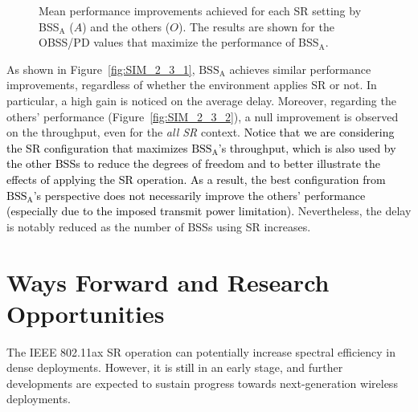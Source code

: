 \documentclass[preprint,12pt]{elsarticle}
\theoremstyle{plain}
\begin{document}
\begin{figure}[ht!]
	\centering		
	\caption{Mean performance improvements achieved for each SR setting by BSS$_\text{A}$ ($A$) and the others ($O$). The results are shown for the OBSS/PD values that maximize the performance of BSS$_\text{A}$.}\label{fig:SIM_2_3}
\end{figure}

As shown in Figure~\ref{fig:SIM_2_3_1}, $\text{BSS}_\text{A}$ achieves similar performance improvements, regardless of whether the environment applies SR or not. In particular, a high gain is noticed on the average delay. Moreover, regarding the others' performance (Figure~\ref{fig:SIM_2_3_2}), a null improvement is observed on the throughput, even for the \emph{all SR} context. \textcolor{black}{Notice that we are considering the SR configuration that maximizes $\text{BSS}_\text{A}$'s throughput, which is also used by the other BSSs to reduce the degrees of freedom and to better illustrate the effects of applying the SR operation. As a result, the best configuration from $\text{BSS}_\text{A}$'s perspective does not necessarily improve the others' performance (especially due to the imposed transmit power limitation).} Nevertheless, the delay is notably reduced as the number of BSSs using SR increases.

\section{Ways Forward and Research Opportunities}
\label{section:ways_forwad}
The IEEE 802.11ax SR operation can potentially increase spectral efficiency in dense deployments. However, it is \textcolor{black}{still} in an early stage, and further developments are expected to sustain progress towards next-generation wireless deployments. 
\end{document}
